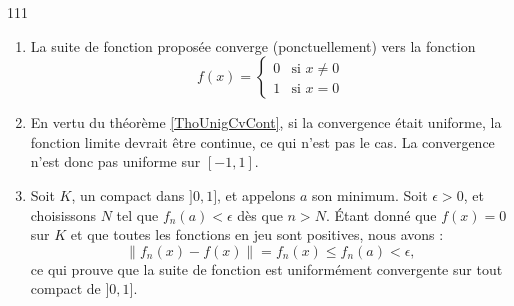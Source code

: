 

\begin{corrige}{111}

%

\begin{enumerate}
\item 

La suite de fonction proposée converge (ponctuellement) vers la fonction
\begin{equation}
	f(x)=
\begin{cases}
	0	&	\text{si $x\neq 0$}\\
	1	&	 \text{si $x=0$}
\end{cases}
\end{equation}
\item En vertu du théorème \ref{ThoUnigCvCont}, si la convergence était uniforme, la fonction limite devrait être continue, ce qui n'est pas le cas. La convergence n'est donc pas uniforme sur $[-1,1]$.

\item

Soit $K$, un compact dans $]0,1]$, et appelons $a$ son minimum. Soit $\epsilon>0$, et choisissons $N$ tel que $f_n(a)<\epsilon$ dès que $n>N$. Étant donné que $f(x)=0$ sur $K$ et que toutes les fonctions en jeu sont positives, nous avons :
\begin{equation}
	\| f_n(x)-f(x) \|=f_n(x)\leq f_n(a)<\epsilon,
\end{equation}
ce qui prouve que la suite de fonction est uniformément convergente sur tout compact de $]0,1]$.

\end{enumerate}

\end{corrige}



